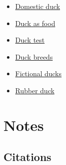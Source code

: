 \documentclass[11pt,a4paper]{article}
\begin{document}
\begin{itemize}
\item \href{/wiki/Domestic\_duck}{Domestic duck}
\item \href{/wiki/Duck\_as\_food}{Duck as food}
\item \href{/wiki/Duck\_test}{Duck test}
\item \href{/wiki/List\_of\_duck\_breeds}{Duck breeds}
\item \href{/wiki/List\_of\_fictional\_ducks}{Fictional ducks}
\item \href{/wiki/Rubber\_duck}{Rubber duck}
\end{itemize}

\section{Notes}

\subsection{Citations}
\end{document}
